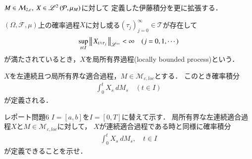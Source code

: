 	$M \in \mathcal{M}_{2,c},\ X \in \mathscr{L}^{2} \left(\mathcal{P},\mu_M\right)$に対して
	定義した伊藤積分を更に拡張する．
	
	\begin{screen}
		\begin{dfn}[局所有界過程]
			$(\Omega,\mathcal{F},\mu)$上の確率過程$X$に対し或る$(\tau_j)_{j=0}^{\infty} \in \mathcal{T}$が存在して
			\begin{align}
				\operatorname*{sup}_{t \in I} \left\|\, X_{t \wedge \tau_j}\, \right\|_{\mathscr{L}^\infty} < \infty
				\quad (j=0,1,\cdots)
			\end{align}
			が満たされているとき，$X$を局所有界過程(locally bounded process)という．
		\end{dfn}
	\end{screen}

	\begin{screen}
		\begin{thm}[局所マルチンゲールと左連続局所有界適合過程に対する伊藤積分]
			$X$を左連続且つ局所有界な適合過程，$M \in \mathcal{M}_{c,loc}$とする．
			このとき確率積分
			\begin{align}
				\int_0^t X_s\ dM_s \quad (t \in I)
			\end{align}
			が定義される．
			\label{thm:Ito_integral_on_M_c_loc_and_left_cont_locally_bounded}
		\end{thm}
	\end{screen}
	
\newpage
	\begin{itembox}[l]{レポート問題6}
	$I = [a,b]$を$I = [0,T]$に替えて示す．
	局所有界な左連続適合過程$X$と$M \in \mathcal{M}_{c,loc}$に対して，
	$X$が連続適合過程である時と同様に確率積分
	\begin{align}
		\int_0^t X_s\ dM_s,
		\quad t \in I
	\end{align}
	が定義できることを示せ．
	\end{itembox}
	
